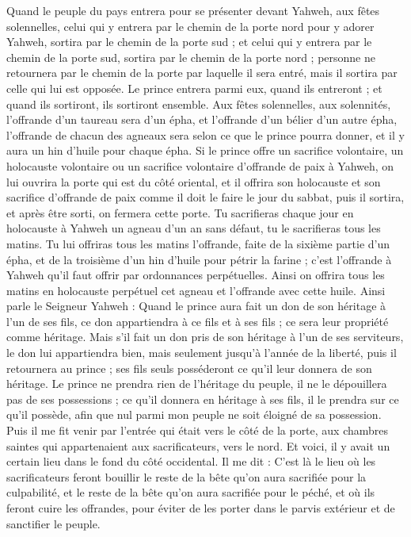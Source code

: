 \begin{multicols}{2}
Quand le peuple du pays entrera pour se présenter devant Yahweh, aux fêtes solennelles, celui qui y entrera par le chemin de la porte nord pour y adorer Yahweh, sortira par le chemin de la porte sud ; et celui qui y entrera par le chemin de la porte sud, sortira par le chemin de la porte nord ; personne ne retournera par le chemin de la porte par laquelle il sera entré, mais il sortira par celle qui lui est opposée.
Le prince entrera parmi eux, quand ils entreront ; et quand ils sortiront, ils sortiront ensemble.
Aux fêtes solennelles, aux solennités, l’offrande d’un taureau sera d'un épha, et l’offrande d'un bélier d'un autre épha, l’offrande de chacun des agneaux sera selon ce que le prince pourra donner, et il y aura un hin d'huile pour chaque épha.
Si le prince offre un sacrifice volontaire, un holocauste volontaire ou un sacrifice volontaire d’offrande de paix à Yahweh, on lui ouvrira la porte qui est du côté oriental, et il offrira son holocauste et son sacrifice d’offrande de paix comme il doit le faire le jour du sabbat, puis il sortira, et après être sorti, on fermera cette porte.
Tu sacrifieras chaque jour en holocauste à Yahweh un agneau d'un an sans défaut, tu le sacrifieras tous les matins.
Tu lui offriras tous les matins l’offrande, faite de la sixième partie d'un épha, et de la troisième d'un hin d'huile pour pétrir la farine ; c'est l’offrande à Yahweh qu'il faut offrir par ordonnances perpétuelles.
Ainsi on offrira tous les matins en holocauste perpétuel cet agneau et l’offrande avec cette huile.
Ainsi parle le Seigneur Yahweh : Quand le prince aura fait un don de son héritage à l’un de ses fils, ce don appartiendra à ce fils et à ses fils ; ce sera leur propriété comme héritage.
Mais s'il fait un don pris de son héritage à l'un de ses serviteurs, le don lui appartiendra bien, mais seulement jusqu’à l’année de la liberté, puis il retournera au prince ; ses fils seuls posséderont ce qu’il leur donnera de son héritage\FTNT{}.
Le prince ne prendra rien de l'héritage du peuple, il ne le dépouillera pas de ses possessions ; ce qu’il donnera en héritage à ses fils, il le prendra sur ce qu’il possède, afin que nul parmi mon peuple ne soit éloigné de sa possession.
Puis il me fit venir par l'entrée qui était vers le côté de la porte, aux chambres saintes qui appartenaient aux sacrificateurs, vers le nord. Et voici, il y avait un certain lieu dans le fond du côté occidental.
Il me dit : C'est là le lieu où les sacrificateurs feront bouillir le reste de la bête qu’on aura sacrifiée pour la culpabilité, et le reste de la bête qu’on aura sacrifiée pour le péché, et où ils feront cuire les offrandes, pour éviter de les porter dans le parvis extérieur et de sanctifier le peuple\FTNT{}.

\end{multicols}
